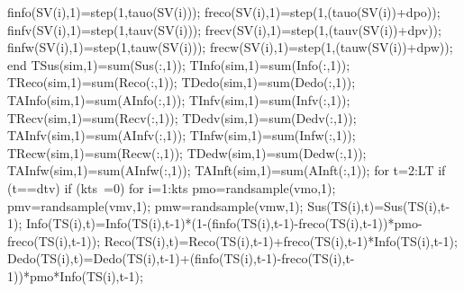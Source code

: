                     finfo(SV(i),1)=step(1,tauo(SV(i))); %
                    freco(SV(i),1)=step(1,(tauo(SV(i))+dpo)); %
                    finfv(SV(i),1)=step(1,tauv(SV(i))); %
                    frecv(SV(i),1)=step(1,(tauv(SV(i))+dpv)); %
                    finfw(SV(i),1)=step(1,tauw(SV(i))); %
                    frecw(SV(i),1)=step(1,(tauw(SV(i))+dpw)); %
                end        
                TSus(sim,1)=sum(Sus(:,1));
                TInfo(sim,1)=sum(Info(:,1));
                TReco(sim,1)=sum(Reco(:,1));
                TDedo(sim,1)=sum(Dedo(:,1));
                TAInfo(sim,1)=sum(AInfo(:,1)); 
                TInfv(sim,1)=sum(Infv(:,1));
                TRecv(sim,1)=sum(Recv(:,1));
                TDedv(sim,1)=sum(Dedv(:,1));
                TAInfv(sim,1)=sum(AInfv(:,1)); 
                TInfw(sim,1)=sum(Infw(:,1));
                TRecw(sim,1)=sum(Recw(:,1));
                TDedw(sim,1)=sum(Dedw(:,1));
                TAInfw(sim,1)=sum(AInfw(:,1));                 
                TAInft(sim,1)=sum(AInft(:,1));
              for t=2:LT                                                                                        
                          if (t==dtv)
                                  if (kts~=0)
                                      for i=1:kts 
                                            pmo=randsample(vmo,1);
                                            pmv=randsample(vmv,1);
                                            pmw=randsample(vmw,1);
                                            Sus(TS(i),t)=Sus(TS(i),t-1);
                                            Info(TS(i),t)=Info(TS(i),t-1)*(1-(finfo(TS(i),t-1)-freco(TS(i),t-1))*pmo-freco(TS(i),t-1));
                                            Reco(TS(i),t)=Reco(TS(i),t-1)+freco(TS(i),t-1)*Info(TS(i),t-1);
                                            Dedo(TS(i),t)=Dedo(TS(i),t-1)+(finfo(TS(i),t-1)-freco(TS(i),t-1))*pmo*Info(TS(i),t-1);
